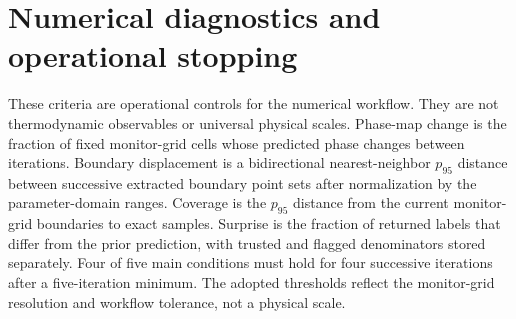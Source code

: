 \section{Numerical diagnostics and operational stopping}
These criteria are operational controls for the numerical workflow. They are not thermodynamic observables or universal physical scales. Phase-map change is the fraction of fixed monitor-grid cells whose predicted phase changes between iterations. Boundary displacement is a bidirectional nearest-neighbor $p_{95}$ distance between successive extracted boundary point sets after normalization by the parameter-domain ranges. Coverage is the $p_{95}$ distance from the current monitor-grid boundaries to exact samples. Surprise is the fraction of returned labels that differ from the prior prediction, with trusted and flagged denominators stored separately. Four of five main conditions must hold for four successive iterations after a five-iteration minimum. The adopted thresholds reflect the monitor-grid resolution and workflow tolerance, not a physical scale.
\begin{table}[t]\caption{Operational diagnostics.}\centering\small{}\end{table}

